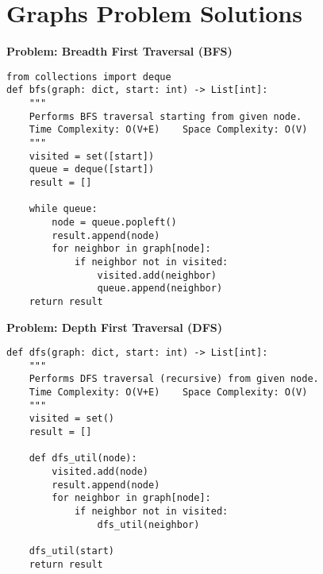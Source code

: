 % 
% 
\section*{Graphs Problem Solutions}
\noindent\textbf{Problem: Breadth First Traversal (BFS)}
\begin{verbatim}
from collections import deque
def bfs(graph: dict, start: int) -> List[int]:
    """
    Performs BFS traversal starting from given node.
    Time Complexity: O(V+E)    Space Complexity: O(V)
    """
    visited = set([start])
    queue = deque([start])
    result = []
    
    while queue:
        node = queue.popleft()
        result.append(node)
        for neighbor in graph[node]:
            if neighbor not in visited:
                visited.add(neighbor)
                queue.append(neighbor)
    return result
\end{verbatim}

\noindent\textbf{Problem: Depth First Traversal (DFS)}
\begin{verbatim}
def dfs(graph: dict, start: int) -> List[int]:
    """
    Performs DFS traversal (recursive) from given node.
    Time Complexity: O(V+E)    Space Complexity: O(V)
    """
    visited = set()
    result = []
    
    def dfs_util(node):
        visited.add(node)
        result.append(node)
        for neighbor in graph[node]:
            if neighbor not in visited:
                dfs_util(neighbor)
    
    dfs_util(start)
    return result
\end{verbatim}

